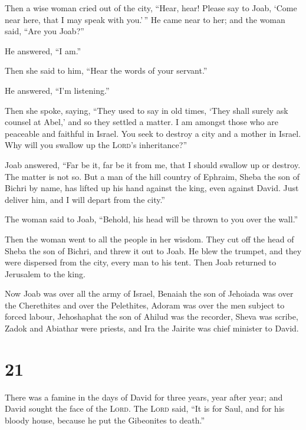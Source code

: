  Then a wise woman cried out of the city, ``Hear, hear!
Please say to Joab, `Come near here, that I may speak with you.'\,''
 He came near to her; and the woman said, ``Are you
Joab?''

He answered, ``I am.''

Then she said to him, ``Hear the words of your servant.''

He answered, ``I'm listening.''

 Then she spoke, saying, ``They used to say in old times,
`They shall surely ask counsel at Abel,' and so they settled a matter.
 I am amongst those who are peaceable and faithful in
Israel. You seek to destroy a city and a mother in Israel. Why will you
swallow up the \textsc{Lord}'s inheritance?''

 Joab answered, ``Far be it, far be it from me, that I
should swallow up or destroy.  The matter is not so. But
a man of the hill country of Ephraim, Sheba the son of Bichri by name,
has lifted up his hand against the king, even against David. Just
deliver him, and I will depart from the city.''

The woman said to Joab, ``Behold, his head will be thrown to you over
the wall.''

 Then the woman went to all the people in her wisdom.
They cut off the head of Sheba the son of Bichri, and threw it out to
Joab. He blew the trumpet, and they were dispersed from the city, every
man to his tent. Then Joab returned to Jerusalem to the king.

 Now Joab was over all the army of Israel, Benaiah the
son of Jehoiada was over the Cherethites and over the Pelethites,
 Adoram was over the men subject to forced labour,
Jehoshaphat the son of Ahilud was the recorder,  Sheva
was scribe, Zadok and Abiathar were priests,  and Ira the
Jairite was chief minister to David.

\hypertarget{section-20}{%
\section{21}\label{section-20}}

 There was a famine in the days of David for three years,
year after year; and David sought the face of the \textsc{Lord}. The
\textsc{Lord} said, ``It is for Saul, and for his bloody house, because
he put the Gibeonites to death.''

